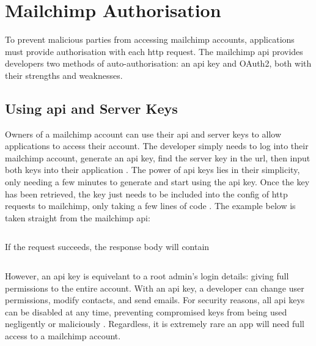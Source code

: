 \documentclass[11pt]{article}
\begin{document}
\newpage

\section{Mailchimp Authorisation}

To prevent malicious parties from accessing \Gls{mailchimp} accounts, applications must provide authorisation with each \acrshort{http} \gls{request}. The \Gls{mailchimp} \acrshort{api} provides developers two methods of auto-authorisation: an \acrshort{api} key and OAuth2, both with their strengths and weaknesses.

\subsection{Using \acrshort{api} and Server Keys}

Owners of a \Gls{mailchimp} account can use their \acrshort{api} and \gls{server} keys to allow applications to access their account. The developer simply needs to log into their \Gls{mailchimp} account, generate an \acrshort{api} key, find the \gls{server} key in the \acrshort{url}, then input both keys into their application \cite{mailchimp-api-key}. The power of \acrshort{api} keys lies in their simplicity, only needing a few minutes to generate and start using the \acrshort{api} key. Once the key has been retrieved, the key just needs to be included into the config of \acrshort{http} \glspl{request} to \Gls{mailchimp}, only taking a few lines of code \cite{mailchimp-first-api-call}. The example below is taken straight from the \Gls{mailchimp} \acrshort{api}:

\inputminted[linenos=true]{python}{mailchimp_examples/mailchimp_ping.py}

\noindent
If the \gls{request} succeeds, the \gls{response} body will contain

\inputminted{json}{mailchimp_examples/ping_response.json}

However, an \acrshort{api} key is equivelant to a root admin's login details: giving full permissions to the entire account. With an \acrshort{api} key, a developer can change \gls{user} permissions, modify contacts, and send emails. For security reasons, all \acrshort{api} keys can be disabled at any time, preventing compromised keys from being used negligently or maliciously \cite{mailchimp-api-key}. Regardless, it is extremely rare an app will need full access to a \Gls{mailchimp} account.
\end{document}
